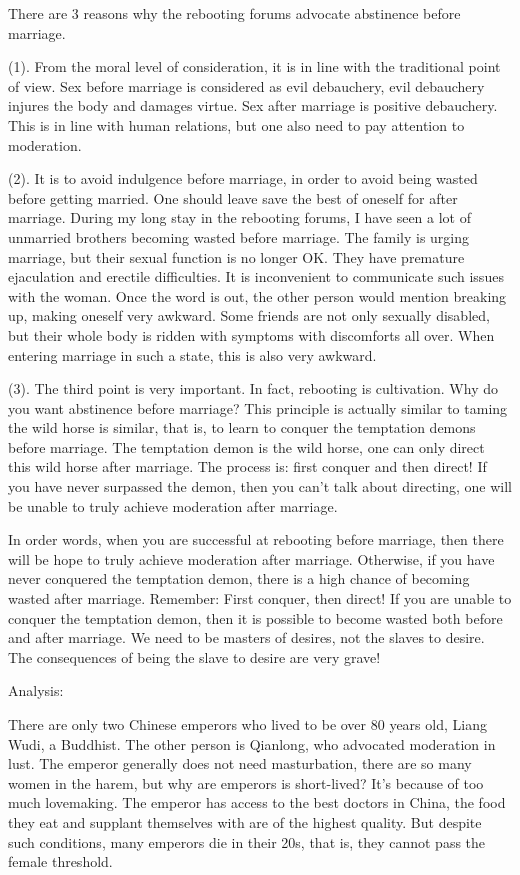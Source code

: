 \documentclass[
]{book}
\begin{document}
There are 3 reasons why the rebooting forums advocate abstinence before marriage.

(1). From the moral level of consideration, it is in line with the traditional point of view. Sex before marriage is considered as evil debauchery, evil debauchery injures the body and damages virtue. Sex after marriage is positive debauchery. This is in line with human relations, but one also need to pay attention to moderation.

(2). It is to avoid indulgence before marriage, in order to avoid being wasted before getting married. One should leave save the best of oneself for after marriage. During my long stay in the rebooting forums, I have seen a lot of unmarried brothers becoming wasted before marriage. The family is urging marriage, but their sexual function is no longer OK. They have premature ejaculation and erectile difficulties. It is inconvenient to communicate such issues with the woman. Once the word is out, the other person would mention breaking up, making oneself very awkward. Some friends are not only sexually disabled, but their whole body is ridden with symptoms with discomforts all over. When entering marriage in such a state, this is also very awkward.

(3). The third point is very important. In fact, rebooting is cultivation. Why do you want abstinence before marriage? This principle is actually similar to taming the wild horse is similar, that is, to learn to conquer the temptation demons before marriage. The temptation demon is the wild horse, one can only direct this wild horse after marriage. The process is: first conquer and then direct! If you have never surpassed the demon, then you can't talk about directing, one will be unable to truly achieve moderation after marriage.

In order words, when you are successful at rebooting before marriage, then there will be hope to truly achieve moderation after marriage. Otherwise, if you have never conquered the temptation demon, there is a high chance of becoming wasted after marriage. Remember: First conquer, then direct! If you are unable to conquer the temptation demon, then it is possible to become wasted both before and after marriage. We need to be masters of desires, not the slaves to desire. The consequences of being the slave to desire are very grave!

Analysis:

There are only two Chinese emperors who lived to be over 80 years old, Liang Wudi, a Buddhist. The other person is Qianlong, who advocated moderation in lust. The emperor generally does not need masturbation, there are so many women in the harem, but why are emperors is short-lived? It's because of too much lovemaking. The emperor has access to the best doctors in China, the food they eat and supplant themselves with are of the highest quality. But despite such conditions, many emperors die in their 20s, that is, they cannot pass the female threshold.
\end{document}
